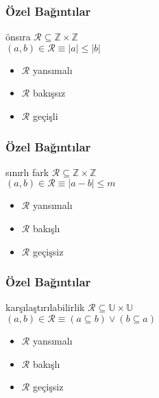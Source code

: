 \documentclass[dvipsnames]{beamer}
\theoremstyle{definition}
\theoremstyle{example}
\theoremstyle{plain}
\begin{document}
\begin{frame}
  \frametitle{Özel Bağıntılar}

  \begin{block}{önsıra}
    $\mathcal{R} \subseteq \mathbb{Z} \times \mathbb{Z}$\\
    $(a,b) \in \mathcal{R} \equiv |a| \leq |b|$

    \medskip
    \begin{itemize}
      \item $\mathcal{R}$ yansımalı
      \item $\mathcal{R}$ bakışsız
      \item $\mathcal{R}$ geçişli
    \end{itemize}
  \end{block}
\end{frame}

\begin{frame}
  \frametitle{Özel Bağıntılar}

  \begin{block}{sınırlı fark}
    $\mathcal{R} \subseteq \mathbb{Z} \times \mathbb{Z}$\\
    $(a,b) \in \mathcal{R} \equiv |a-b| \leq m$

    \medskip
    \begin{itemize}
      \item $\mathcal{R}$ yansımalı
      \item $\mathcal{R}$ bakışlı
      \item $\mathcal{R}$ geçişsiz
    \end{itemize}
  \end{block}
\end{frame}

\begin{frame}
  \frametitle{Özel Bağıntılar}

  \begin{block}{karşılaştırılabilirlik}
    $\mathcal{R} \subseteq \mathbb{U} \times \mathbb{U}$\\
    $(a,b) \in \mathcal{R} \equiv (a \subseteq b) \vee (b \subseteq a)$

    \medskip
    \begin{itemize}
      \item $\mathcal{R}$ yansımalı
      \item $\mathcal{R}$ bakışlı
      \item $\mathcal{R}$ geçişsiz
    \end{itemize}
  \end{block}
\end{frame}
\end{document}
